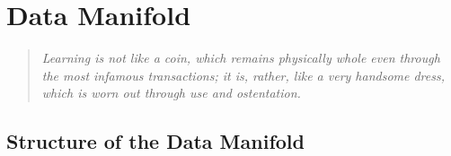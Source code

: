 \documentclass[../main.tex]{subfiles}
\begin{document}
\chapter{Data Manifold}\label{chap:data_manifold}


\begin{quote}
    \emph{Learning is not like a coin, which remains physically whole even through the most infamous transactions; it is, rather, like a very handsome dress, which is worn out through use and ostentation.}\\
  \end{quote}

\cleardoublepage%



\section{Structure of the Data Manifold}
\end{document}
